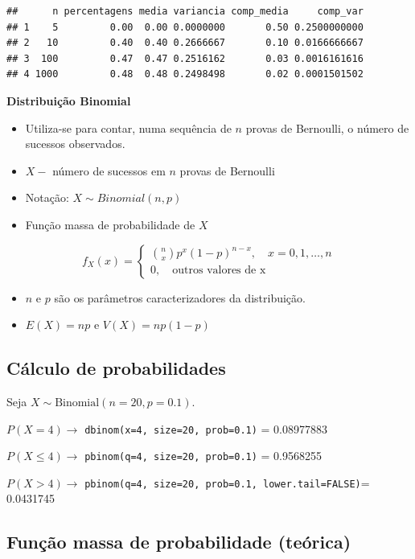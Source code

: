 \documentclass[
]{book}
\begin{document}
\begin{verbatim}
##      n percentagens media variancia comp_media     comp_var
## 1    5         0.00  0.00 0.0000000       0.50 0.2500000000
## 2   10         0.40  0.40 0.2666667       0.10 0.0166666667
## 3  100         0.47  0.47 0.2516162       0.03 0.0016161616
## 4 1000         0.48  0.48 0.2498498       0.02 0.0001501502
\end{verbatim}

\textbf{Distribuição Binomial}

\begin{itemize}
\item
  Utiliza-se para contar, numa sequência de \(n\) provas de Bernoulli, o
  número de sucessos observados.
\item
  \(X -\) número de sucessos em \(n\) provas de Bernoulli
\item
  Notação: \(X \sim Binomial(n,p)\)
\item
  Função massa de probabilidade de \(X\)
\end{itemize}

\[f_{X}(x) = \begin{cases}
\binom{n}{x}p^{x}(1-p)^{n-x}, \quad x=0,1,\ldots,n \\
0, \quad \text{outros valores de x}
\end{cases}\]

\begin{itemize}
\item
  \(n\) e \(p\) são os parâmetros caracterizadores da distribuição.
\item
  \(E(X)=np\) e \(V(X)=np(1-p)\)
\end{itemize}

\subsection{Cálculo de probabilidades}\label{cuxe1lculo-de-probabilidades}

Seja \(X\sim\text{Binomial}(n=20, p=0.1)\).

\(P(X = 4) \to\) \texttt{dbinom(x=4,\ size=20,\ prob=0.1)} = 0.08977883

\noindent \(P(X\leq 4) \to\) \texttt{pbinom(q=4,\ size=20,\ prob=0.1)} = 0.9568255

\noindent \(P(X > 4)\to\)
\texttt{pbinom(q=4,\ size=20,\ prob=0.1,\ lower.tail=FALSE)}= 0.0431745

\subsection{Função massa de probabilidade (teórica)}\label{funuxe7uxe3o-massa-de-probabilidade-teuxf3rica}
\end{document}

